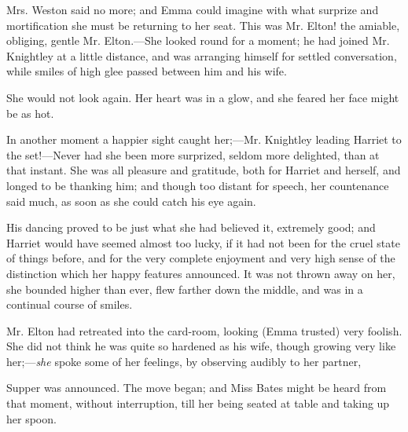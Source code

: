  

Mrs. Weston said no more; and Emma could imagine with what surprize and mortification she must be returning to her seat. This was Mr. Elton! the amiable, obliging, gentle Mr. Elton.---She looked round for a moment; he had joined Mr. Knightley at a little distance, and was arranging himself for settled conversation, while smiles of high glee passed between him and his wife.

She would not look again. Her heart was in a glow, and she feared her face might be as hot.

In another moment a happier sight caught her;---Mr. Knightley leading Harriet to the set!---Never had she been more surprized, seldom more delighted, than at that instant. She was all pleasure and gratitude, both for Harriet and herself, and longed to be thanking him; and though too distant for speech, her countenance said much, as soon as she could catch his eye again.

His dancing proved to be just what she had believed it, extremely good; and Harriet would have seemed almost too lucky, if it had not been for the cruel state of things before, and for the very complete enjoyment and very high sense of the distinction which her happy features announced. It was not thrown away on her, she bounded higher than ever, flew farther down the middle, and was in a continual course of smiles.

Mr. Elton had retreated into the card-room, looking (Emma trusted) very foolish. She did not think he was quite so hardened as his wife, though growing very like her;---{\em she} spoke some of her feelings, by observing audibly to her partner,


Supper was announced. The move began; and Miss Bates might be heard from that moment, without interruption, till her being seated at table and taking up her spoon.

